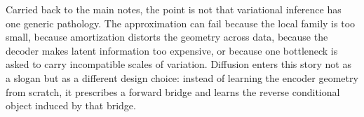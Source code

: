 \documentclass[11pt]{article}
\makeatletter
\def@path{{../../}{../}{Lecture Tex/}}
\makeatother
\begin{document}
Carried back to the main notes, the point is not that variational inference has one generic pathology.
The approximation can fail because the local family is too small, because amortization distorts the geometry across data, because the decoder makes latent information too expensive, or because one bottleneck is asked to carry incompatible scales of variation.
Diffusion enters this story not as a slogan but as a different design choice: instead of learning the encoder geometry from scratch, it prescribes a forward bridge and learns the reverse conditional object induced by that bridge.


\makeatletter
\begingroup
{}\@empty
{}
\endgroup
\makeatother

\end{document}
